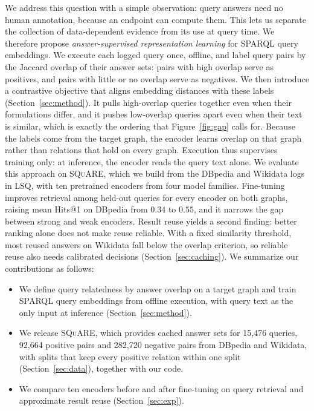 \documentclass[runningheads]{llncs}
\newcommand{\squareds}{\textsc{SQuARE}}
\begin{document}
We address this question with a simple observation: query answers need no
human annotation, because an endpoint can compute them. This lets us
separate the collection of data-dependent evidence from its use at query
time. We therefore propose \emph{answer-supervised representation learning}
for SPARQL query embeddings. We execute each logged query once, offline, and
label query pairs by the Jaccard overlap of their answer sets: pairs with
high overlap serve as positives, and pairs with little or no overlap serve
as negatives.
We then introduce a contrastive objective that aligns embedding distances
with these labels (Section~\ref{sec:method}). It pulls high-overlap queries
together even when their formulations differ, and it pushes low-overlap
queries apart even when their text is similar, which is exactly the ordering
that Figure~\ref{fig:gap} calls for. Because the labels come from the target
graph, the encoder learns overlap on that graph rather than relations that
hold on every graph. Execution thus supervises training only: at inference,
the encoder reads the query text alone.
We evaluate this approach on \squareds{}, which we build from the DBpedia
and Wikidata logs in LSQ, with ten pretrained encoders from four model
families. Fine-tuning improves retrieval among held-out queries for
every encoder on both graphs, raising mean Hits@1 on DBpedia from $0.34$ to
$0.55$, and it narrows the gap between strong and weak encoders. Result
reuse yields a second finding: better ranking alone does not make reuse
reliable. With a fixed similarity threshold, most reused answers on Wikidata
fall below the overlap criterion, so reliable reuse also needs calibrated
decisions (Section~\ref{sec:caching}). We summarize our contributions as follows:
\begin{itemize}
  \item We define query relatedness by answer
        overlap on a target graph and train SPARQL query embeddings from
        offline execution, with query text as the only input at inference
        (Section~\ref{sec:method}).
  \item We release \squareds{}, which provides cached
        answer sets for 15{,}476 queries, 92{,}664 positive pairs and
        282{,}720 negative pairs from DBpedia and Wikidata, with splits that
        keep every positive relation within one split
        (Section~\ref{sec:data}), together with our code.
  \item We compare ten encoders before and after
        fine-tuning on query retrieval and approximate result reuse
        (Section~\ref{sec:exp}).
\end{itemize}
\end{document}

